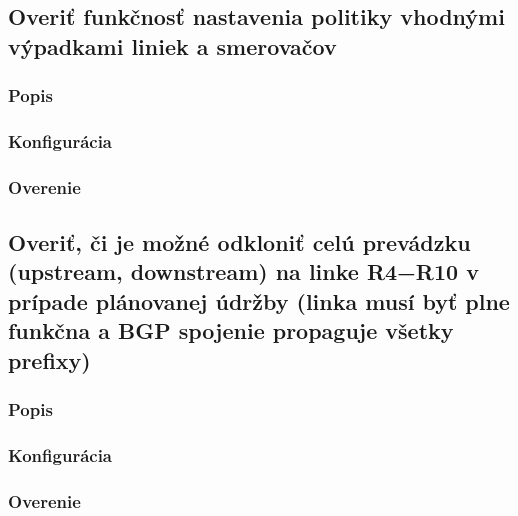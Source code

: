 \documentclass[12pt,twoside,a4paper]{report}
\begin{document}
\subsection{Overiť funkčnosť nastavenia politiky vhodnými výpadkami liniek a smerovačov}
\subsubsection{Popis}
\paragraph{}

\subsubsection{Konfigurácia}
\paragraph{}

\subsubsection{Overenie}
\paragraph{}







\subsection{Overiť, či je možné odkloniť celú prevádzku (upstream, downstream) na linke R4−R10 v prípade plánovanej údržby (linka musí byť plne funkčna a BGP spojenie propaguje všetky prefixy)}
\subsubsection{Popis}
\paragraph{}

\subsubsection{Konfigurácia}
\paragraph{}

\subsubsection{Overenie}
\paragraph{}
\end{document}
